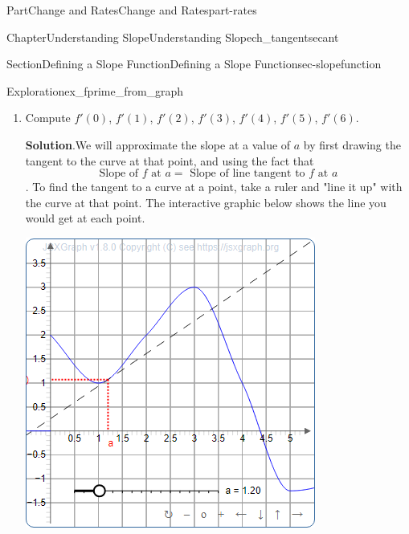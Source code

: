 \documentclass[oneside,10pt,]{tufte-book}
\newcommand{\blocktitlefont}{\relax}
\numberwithin{equation}{chapter}
\begin{document}
\begin{partptx}{Part}{Change and Rates}{}{Change and Rates}{}{}{part-rates}
\begin{chapterptx}{Chapter}{Understanding Slope}{}{Understanding Slope}{}{}{ch_tangentsecant}
\begin{sectionptx}{Section}{Defining a Slope Function}{}{Defining a Slope Function}{}{}{sec-slopefunction}
\begin{exploration}{Exploration}{}{ex_fprime_from_graph}
\begin{image}{0.125}{0.75}{0.125}{}
{\begin{tikzpicture}
\end{tikzpicture}
}%
\end{image}%
\begin{enumerate}[font=\bfseries,label=(\alph*),ref=\alph*]%
\item{}Compute \(f'(0)\), \(f'(1)\), \(f'(2)\), \(f'(3)\), \(f'(4)\), \(f'(5)\), \(f'(6)\).%
\par\smallskip%
\noindent\textbf{\blocktitlefont Solution}.\hypertarget{ex_fprime_from_graph-2-2}{}\quad{}We will approximate the slope at a value of \(a\) by first drawing the tangent to the curve at that point, and using the fact that%
\begin{equation*}
\text{Slope of  } f \text{ at }a = \text{ Slope of line tangent to }f \text{ at }a
\end{equation*}
. To find the tangent to a curve at a point, take a ruler and "line it up" with the curve at that point. The interactive graphic below shows the line you would get at each point.%
\par
\begin{sidebyside}{2}{0.075}{0.075}{0.17}%
\begin{sbspanel}{0.47}%
\includegraphics[width=\linewidth]{generated/preview/ex_fprime_from_graph-2-2-2-1-preview.png}
\end{sbspanel}%
\begin{sbspanel}{0.21}%

\end{sbspanel}
\end{sidebyside}
\end{enumerate}
\end{exploration}
\end{sectionptx}
\end{chapterptx}
\end{partptx}
\end{document}
